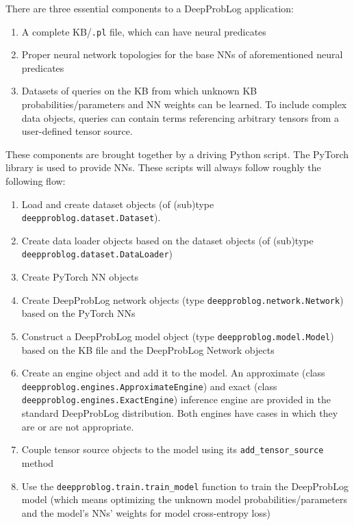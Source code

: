 There are three essential components to a DeepProbLog application:
\begin{enumerate}
  \item A complete KB/\texttt{.pl} file, which can have neural predicates
  \item Proper neural network topologies for the base NNs of aforementioned neural predicates
  \item Datasets of queries on the KB from which unknown KB probabilities/parameters and NN weights can be learned. To include complex data objects, queries can contain terms referencing arbitrary tensors from a user-defined tensor source.
\end{enumerate}
These components are brought together by a driving Python script. The PyTorch library is used to provide NNs. These scripts will always follow roughly the following flow:
\begin{enumerate}
  \item Load and create dataset objects (of (sub)type \texttt{deepproblog.dataset.Dataset}).
  \item Create data loader objects based on the dataset objects (of (sub)type \\\texttt{deepproblog.dataset.DataLoader})
  \item Create PyTorch NN objects
  \item Create DeepProbLog network objects (type \texttt{deepproblog.network.Network}) based on the PyTorch NNs
  \item Construct a DeepProbLog model object (type \texttt{deepproblog.model.Model}) based on the KB file and the DeepProbLog Network objects
  \item Create an engine object and add it to the model. An approximate (class \texttt{deepproblog.engines.ApproximateEngine}) and exact (class \\\texttt{deepproblog.engines.ExactEngine}) inference engine are provided in the standard DeepProbLog distribution. Both engines have cases in which they are or are not appropriate.
  \item Couple tensor source objects to the model using its \texttt{add\_tensor\_source} method
  \item Use the \texttt{deepproblog.train.train\_model} function to train the DeepProbLog model (which means optimizing the unknown model probabilities/parameters and the model's NNs' weights for model cross-entropy loss)
\end{enumerate}

